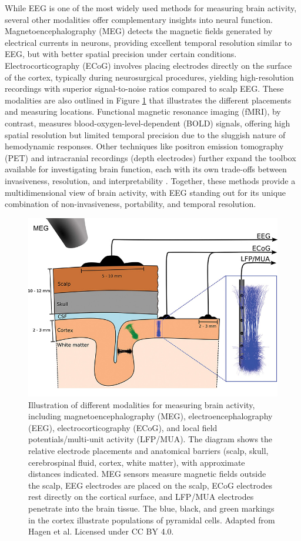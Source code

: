 \documentclass[final, a4paper,masters,en,listoffigures,listoftables,norwegiandates]{NMBU}
\begin{document}
While EEG is one of the most widely used methods for measuring brain activity, several other modalities offer complementary insights into neural function. Magnetoencephalography (MEG) detects the magnetic fields generated by electrical currents in neurons, providing excellent temporal resolution similar to EEG, but with better spatial precision under certain conditions. Electrocorticography (ECoG) involves placing electrodes directly on the surface of the cortex, typically during neurosurgical procedures, yielding high-resolution recordings with superior signal-to-noise ratios compared to scalp EEG. These modalities are also outlined in Figure \ref{fig:modalities} that illustrates the different placements and measuring locations. Functional magnetic resonance imaging (fMRI), by contrast, measures blood-oxygen-level-dependent (BOLD) signals, offering high spatial resolution but limited temporal precision due to the sluggish nature of hemodynamic responses. Other techniques like positron emission tomography (PET) and intracranial recordings (depth electrodes) further expand the toolbox available for investigating brain function, each with its own trade-offs between invasiveness, resolution, and interpretability \cite{Friston2009Modalities}. Together, these methods provide a multidimensional view of brain activity, with EEG standing out for its unique combination of non-invasiveness, portability, and temporal resolution.


\begin{figure}[h]
    \centering
    \includegraphics[width=0.7\linewidth]{Figures/modalities.jpg}
    \caption{Illustration of different modalities for measuring brain activity, including magnetoencephalography (MEG), electroencephalography (EEG), electrocorticography (ECoG), and local field potentials/multi-unit activity (LFP/MUA).
    The diagram shows the relative electrode placements and anatomical barriers (scalp, skull, cerebrospinal fluid, cortex, white matter), with approximate distances indicated. MEG sensors measure magnetic fields outside the scalp, EEG electrodes are placed on the scalp, ECoG electrodes rest directly on the cortical surface, and LFP/MUA electrodes penetrate into the brain tissue. The blue, black, and green markings in the cortex illustrate populations of pyramidal cells. 
    \footnotesize Adapted from Hagen et al. \cite{Hagen2018} Licensed under CC BY 4.0.}
    \label{fig:modalities}
\end{figure}
\end{document}
